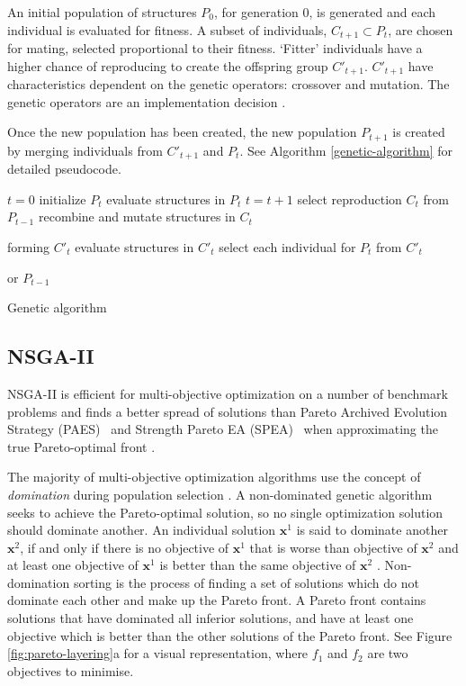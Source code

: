 \documentclass[10pt, conference, compsocconf]{IEEEtran}
\begin{document}
An initial population of structures $P_{0}$, for generation 0, is generated and each individual is evaluated for fitness. A subset of individuals, $C_{t+1} \subset P_{t}$, are chosen for mating, selected proportional to their fitness. `Fitter' individuals have a higher chance of reproducing to create the offspring group $C'_{t+1}$. $C'_{t+1}$ have characteristics dependent on the genetic operators: crossover and mutation. The genetic operators are an implementation decision \cite{FogelDavidB2009}. 

Once the new population has been created, the new population $P_{t+1}$ is created by merging individuals from $C'_{t+1}$ and $P_{t}$. See Algorithm \ref{genetic-algorithm} for detailed pseudocode.
%
\begin{algorithm}[t]
\begin{algorithmic}[1]
\State $t=0$
\State initialize $P_{t}$
\State evaluate structures in $P_{t}$
\State $t=t+1$
\State select reproduction $C_{t}$ from $P_{t-1}$
\State recombine and mutate structures in $C_{t}$

forming $C'_{t}$
\State evaluate structures in $C'_{t}$
\State select each individual for $P_{t}$ from $C'_{t}$ 

or $P_{t-1}$
\EndWhile
\caption{Genetic algorithm \cite{FogelDavidB2009}}
\label{genetic-algorithm}
\end{algorithmic}
\end{algorithm}
\subsection{NSGA-II}
NSGA-II is efficient for multi-objective optimization on a number of benchmark problems and finds a better spread of solutions than Pareto Archived Evolution Strategy (PAES)~\cite{Knowles1999} and Strength Pareto EA (SPEA)~\cite{Zitzler2006} when approximating the true Pareto-optimal front \cite{Valkanas2014}.

The majority of multi-objective optimization algorithms use the concept of \emph{domination} during population selection \cite{Burke2014}. A non-dominated genetic algorithm seeks to achieve the Pareto-optimal solution, so no single optimization solution should dominate another. An individual solution $\mathbf{x}^{1}$ is said to dominate another $\mathbf{x}^{2}$, if and only if there is no objective of $\mathbf{x}^{1}$ that is worse than objective of $\mathbf{x}^{2}$ and at least one objective of $\mathbf{x}^{1}$ is better than the same objective of $\mathbf{x}^{2}$ \cite{Bao2017}. Non-domination sorting is the process of finding a set of solutions which do not dominate each other and make up the Pareto front. A Pareto front contains solutions that have dominated all inferior solutions, and have at least one objective which is better than the other solutions of the Pareto front. See Figure \ref{fig:pareto-layering}a for a visual representation, where $f_1$ and $f_2$ are two objectives to minimise.
\end{document}
